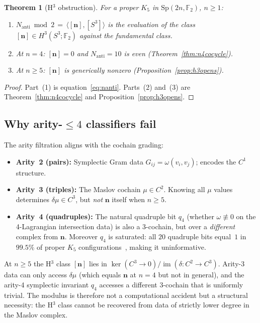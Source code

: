 \documentclass[11pt,a4paper]{article}
\newtheorem{theorem}{Theorem}[section]
\theoremstyle{remark}
\newcommand{\F}{\mathbb{F}}
\newcommand{\Sp}{\mathrm{Sp}}
\newcommand{\Nanti}{N_{\mathrm{anti}}}
\begin{document}
\begin{theorem}[H$^3$ obstruction]\label{thm:obstruction}
For a proper $K_5$ in $\Sp(2n,\F_2)$, $n\ge1$:
\begin{enumerate}
\item $\Nanti\bmod2\,=\,\langle[\mathbf{n}],[S^3]\rangle$
  is the evaluation of the class
  $[\mathbf{n}]\in H^3(S^3;\F_2)$ against the fundamental class.
\item At $n=4$: $[\mathbf{n}]=0$ and $\Nanti=10$ is even
  (Theorem~\ref{thm:n4cocycle}).
\item At $n\ge5$: $[\mathbf{n}]$ is generically nonzero
  (Proposition~\ref{prop:h3opens}).
\end{enumerate}
\end{theorem}

\begin{proof}
Part~(1) is equation~\eqref{eq:nanti}.  Parts~(2) and~(3) are
Theorem~\ref{thm:n4cocycle} and Proposition~\ref{prop:h3opens}.
\end{proof}

\subsection*{Why arity-$\le4$ classifiers fail}

The arity filtration aligns with the cochain grading:
\begin{itemize}
\item \textbf{Arity~2 (pairs):} Symplectic Gram data $G_{ij}=\omega(v_i,v_j)$;
  encodes the $C^1$ structure.
\item \textbf{Arity~3 (triples):} The Maslov cochain $\mu\in C^2$.
  Knowing all $\mu$ values determines $\delta\mu\in C^3$, but
  \emph{not} $\mathbf{n}$ itself when $n\ge5$.
\item \textbf{Arity~4 (quadruples):} The natural quadruple bit $q_4$
  (whether $\omega\not\equiv0$ on the 4-Lagrangian intersection data)
  is also a 3-cochain, but over a \emph{different} complex from $\mathbf{n}$.
  Moreover $q_4$ is saturated: all $20$ quadruple bits equal~$1$ in $99.5\%$
  of proper $K_5$ configurations~\cite{PaperXIX}, making it uninformative.
\end{itemize}

At $n\ge5$ the H$^3$ class $[\mathbf{n}]$ lies in $\ker(C^3\to0)/\operatorname{im}(\delta:C^2\to C^3)$.
Arity-3 data can only access $\delta\mu$ (which equals $\mathbf{n}$ at $n=4$
but not in general), and the arity-4 symplectic invariant $q_4$ accesses a
different 3-cochain that is uniformly trivial.
The modulus is therefore not a computational accident but a structural necessity:
the H$^3$ class cannot be recovered from data of strictly lower degree in the
Maslov complex.
\end{document}
